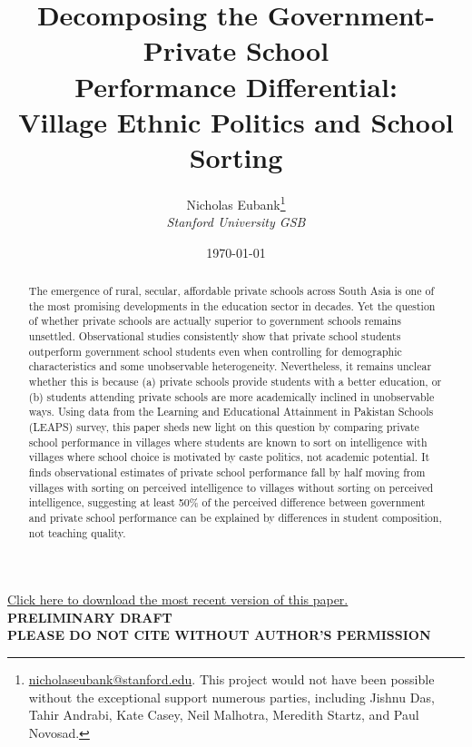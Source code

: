 \documentclass[11pt]{article}
\title{Decomposing the Government-Private School \\ Performance Differential: \\ Village Ethnic Politics and School Sorting}
\author{Nicholas Eubank\footnote{\href{mailto:nicholaseubank@stanford.edu}{nicholaseubank@stanford.edu}. This project would not have been possible without the exceptional support numerous parties, including Jishnu Das, Tahir Andrabi, Kate Casey, Neil Malhotra, Meredith Startz, and Paul Novosad.} \\ \emph{Stanford University GSB}}
\date{\today}
\begin{document}
\maketitle
\begin{center}
\vspace{1.5cm}

{\Large \color{blue}\href{http://www.nickeubank.com/eubank_schoolsorting/}{Click here to download the most recent version of this paper.}\color{black}}
\vspace{1.5cm}\\

\textbf{PRELIMINARY DRAFT \\ PLEASE DO NOT CITE WITHOUT AUTHOR'S PERMISSION} \\
\end{center}

\vspace{0.5cm}

\begin{abstract}
The emergence of rural, secular, affordable private schools across South Asia is one of the most promising developments in the education sector in decades. Yet the question of whether private schools are actually superior to government schools remains unsettled. Observational studies consistently show that private school students outperform government school students even when controlling for demographic characteristics and some unobservable heterogeneity. Nevertheless, it remains unclear whether this is because (a) private schools provide students with a better education, or (b) students attending private schools are more academically inclined in unobservable ways. Using data from the Learning and Educational Attainment in Pakistan Schools (LEAPS) survey, this paper sheds new light on this question by comparing private school performance in villages where students are known to sort on intelligence with villages where school choice is motivated by caste politics, not academic potential. It finds observational estimates of private school performance fall by half moving from villages with sorting on perceived intelligence to villages without sorting on perceived intelligence, suggesting at least 50\% of the perceived difference between government and private school performance can be explained by differences in student composition, not teaching quality.
\end{abstract}

\thispagestyle{empty}



\pagebreak
\end{document}
